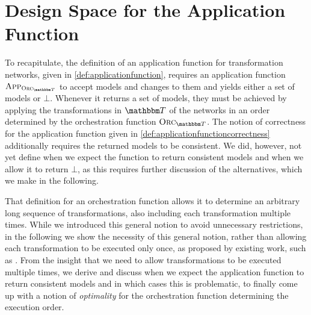 

\section{Design Space for the Application Function} %

To recapitulate, the definition of an application function for transformation networks, given in \autoref{def:applicationfunction}, requires an application function $\appfunction{\orcfunction{\transformationset{T}}}$ to accept models and changes to them and yields either a set of models or $\bot$.
Whenever it returns a set of models, they must be achieved by applying the transformations in $\transformationset{T}$ of the networks in an order determined by the orchestration function $\orcfunction{\transformationset{T}}$.
The notion of correctness for the application function given in \autoref{def:applicationfunctioncorrectness} additionally requires the returned models to be consistent.
We did, however, not yet define when we expect the function to return consistent models and when we allow it to return $\bot$, as this requires further discussion of the alternatives, which we make in the following.

That definition for an orchestration function allows it to determine an arbitrary long sequence of transformations, also including each transformation multiple times.
While we introduced this general notion to avoid unnecessary restrictions, in the following we show the necessity of this general notion, rather than allowing each transformation to be executed only once, as proposed by existing work, such as \cite{stevens2020BidirectionalTransformationLarge-SoSym}.
From the insight that we need to allow transformations to be executed multiple times, we derive and discuss when we expect the application function to return consistent models and in which cases this is problematic, to finally come up with a notion of \emph{optimality} for the orchestration function determining the execution order.

